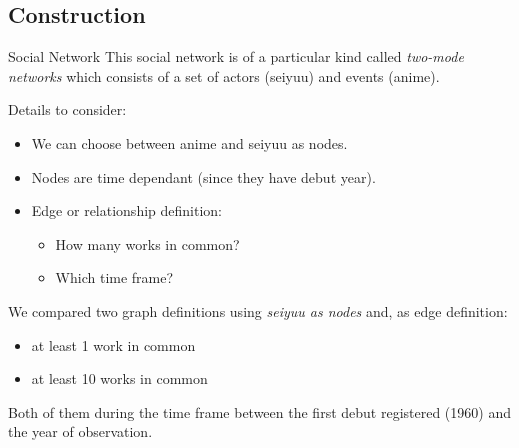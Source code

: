 \subsection{Construction}
\begin{frame}{Social Network}
This social network is of a particular kind called \emph{two-mode networks} which consists of a set of actors (seiyuu) and events (anime).
\vspace{15pt}

Details to consider:
\begin{itemize}
\item We can choose between anime and seiyuu as nodes.
\item Nodes are time dependant (since they have debut year).
\item Edge or relationship definition:
	\begin{itemize}
	\item How many works in common?
	\item Which time frame?
	\end{itemize}
\end{itemize}
\vspace{15pt}
\end{frame}

\begin{frame}
We compared two graph definitions using \emph{seiyuu as nodes} and, as edge definition:
\begin{itemize}
\item at least 1 work in common
\item at least 10 works in common
\end{itemize}
Both of them during the time frame between the first debut registered (1960) and the year of observation.
\end{frame}

